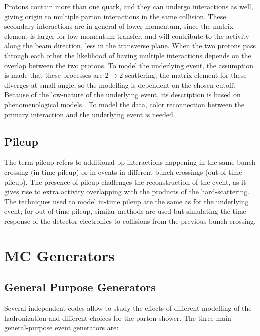 Protons contain more than one quark, and they can undergo interactions as well, giving origin to multiple parton interactions in the same collision.
These secondary interactions are in general of lower momentum, since the matrix element is larger for low momentum transfer, and will contribute to the activity along the beam direction, less in the transverse plane. 
When the two protons pass through each other the likelihood of having multiple interactions depends on the overlap between the two protons. 
To model the underlying event, the assumption is made that these processes are $2\rightarrow2$ scattering; the matrix element for these diverges at small angle, so the modelling is dependent on the chosen \pt cutoff. 
Because of the low-\pt nature of the underlying event, its description is based on phenomenological models \cite{ATL-PHYS-PUB-2014-021,Skands:2010ak}.
To model the data, color reconnection between the primary interaction and the underlying event is needed. 

\subsection{Pileup}

The term pileup refers to additional \gls{pp} interactions happening in the same bunch crossing (in-time pileup) or in events in different bunch crossings (out-of-time pileup). 
The presence of pileup challenges the reconstruction of the event, as it gives rise to extra activity overlapping with the products of the hard-scattering. The techniques used to model in-time pileup are the same as for the underlying event; 
for out-of-time pileup, similar methods are used but simulating the time response of the detector electronics to collisions from the previous bunch crossing. 

\section{MC Generators}

\subsection{General Purpose Generators}

Several independent codes allow to study the effects of different modelling of the hadronization and different choices for the parton shower. The three main general-purpose event generators are:

